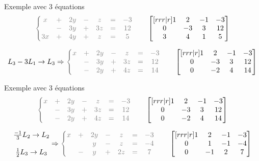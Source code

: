 \documentclass[french]{beamer}
\begin{document}
\begin{frame}{Exemple avec 3 équations}
\[\color{gray}
\left\{
	\begin{matrix}
	x &+& 2y &-& z &=& -3\\
	 &-& 3y &+& 3z &=& 12\\
	3x &+& 4y &+& z &=& 5
	\end{matrix}\right.
	\qquad\color{black}
	\begin{bmatrix}[rrr|r]
1 & 2 & -1 & -3 \\
0 & -3 & 3 & 12 \\
3 & 4 & 1 & 5
\end{bmatrix}
\color{black}
\]

\[
L_3 -3L_1 \rightarrow L_3 \Rightarrow
\color{gray}
\left\{
	\begin{matrix}
	x &+& 2y &-& z &=& -3\\
	&-& 3y &+& 3z &=& 12\\
	&-& 2y &+& 4z &=& 14
	\end{matrix}\right.
	\qquad\color{black}
	\begin{bmatrix}[rrr|r]
1 & 2 & -1 & -3 \\
0 & -3 & 3 & 12 \\
0 & -2 & 4 & 14
\end{bmatrix}
\]
\end{frame}

\begin{frame}{Exemple avec 3 équations}
\[\color{gray}
\left\{
	\begin{matrix}
	x &+& 2y &-& z &=& -3\\
	&-& 3y &+& 3z &=& 12\\
	&-& 2y &+& 4z &=& 14
	\end{matrix}\right.
	\qquad\color{black}
	\begin{bmatrix}[rrr|r]
1 & 2 & -1 & -3 \\
0 & -3 & 3 & 12 \\
0 & -2 & 4 & 14
\end{bmatrix}
\color{black}
\]

\[
\begin{matrix}
\frac{-1}{3}L_2 \rightarrow L_2 \\
\\
\frac{1}{2}L_3 \rightarrow L_3
\end{matrix}
 \Rightarrow
\color{gray}
\left\{
	\begin{matrix}
	x &+& 2y &-& z &=& -3\\
	&& y &-& z &=& -4\\
	&-& y &+& 2z &=& 7
	\end{matrix}\right.
	\qquad\color{black}
	\begin{bmatrix}[rrr|r]
1 & 2 & -1 & -3 \\
0 & 1 & -1 & -4 \\
0 & -1 & 2 & 7
\end{bmatrix}
\]
\end{frame}
\end{document}
